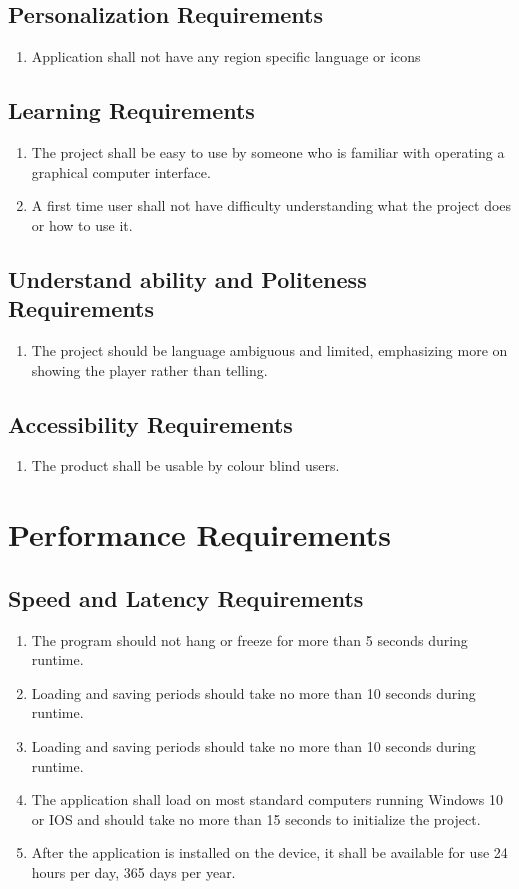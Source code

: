 \documentclass{article}
\begin{document}
\subsection{Personalization Requirements}
\begin{enumerate}[{PR}1. ]
	\item Application shall not have any region specific language or icons
\end{enumerate}
\subsection{Learning Requirements}
\begin{enumerate}[{LR}1. ]
	\item The project shall be easy to use by someone who is familiar with operating a graphical computer interface.
	\item A first time user shall not have difficulty understanding what the project does or how to use it.
\end{enumerate}
\subsection{Understand ability and Politeness Requirements}
\begin{enumerate}[{UPR}1. ]
	\item The project should be language ambiguous and limited, emphasizing more on showing the player rather than telling.
\end{enumerate}
\subsection{Accessibility Requirements}
\begin{enumerate}[{AR}1. ]
	\item The product shall be usable by colour blind users.
\end{enumerate}
\section{Performance Requirements}
\subsection{Speed and Latency Requirements}
\begin{enumerate}[{SLR}1. ]
	\item The program should not hang or freeze for more than 5 seconds during runtime.
	\item Loading and saving periods should take no more than 10 seconds during runtime.
	\item Loading and saving periods should take no more than 10 seconds during runtime.
	\item The application shall load on most standard computers running Windows 10 or IOS and should take no more than 15 seconds to initialize the project.
	\item After the application is installed on the device, it shall be available for use 24 hours per day, 365 days per year.
\end{enumerate}
\end{document}

